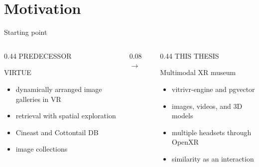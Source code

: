 \section{Motivation}
\begin{frame}[c]{Starting point}
\begin{columns}[T,onlytextwidth]
  \begin{column}{0.44\textwidth}
    \textcolor{unigrey}{\large PREDECESSOR}

    \vspace{0.12cm}
    \Large VIRTUE

    \vspace{0.15cm}
    \small
    \begin{itemize}
      \item dynamically arranged image galleries in VR
      \item retrieval with spatial exploration
      \item Cineast and Cottontail DB
      \item image collections
    \end{itemize}
  \end{column}
  \begin{column}{0.08\textwidth}
    \vspace{1.45cm}
    \centering
    \Huge$\rightarrow$
  \end{column}
  \begin{column}{0.44\textwidth}
    \textcolor{unimint}{\large THIS THESIS}

    \vspace{0.12cm}
    \Large Multimodal XR museum

    \vspace{0.15cm}
    \small
    \begin{itemize}
      \item vitrivr-engine and pgvector
      \item images, videos, and 3D models
      \item multiple headsets through OpenXR
      \item similarity as an interaction
    \end{itemize}
  \end{column}
\end{columns}
\end{frame}
